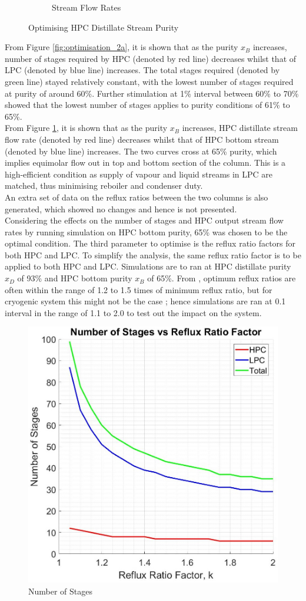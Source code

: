 \begin{figure}[ht]
\begin{subfigure}{0.49\textwidth}
            \caption{Stream Flow Rates} \label{fig:optimisation_2b}
        \end{subfigure}
        \caption{Optimising HPC Distillate Stream Purity} \label{fig:optimsation_2}
    \end{figure}
	From Figure \ref{fig:optimisation_2a}, it is shown that as the purity $x_B$ increases, number of stages required by HPC (denoted by red line) decreases whilst that of LPC (denoted by blue line) increases. The total stages required (denoted by green line) stayed relatively constant, with the lowest number of stages required at purity of around 60\%. Further stimulation at 1\% interval between 60\% to 70\% showed that the lowest number of stages applies to purity conditions of 61\% to 65\%. \\
	From Figure \ref{fig:optimisation_2b}, it is shown that as the purity $x_B$ increases, HPC distillate stream flow rate (denoted by red line) decreases whilst that of HPC bottom stream (denoted by blue line) increases. The two curves cross at 65\% purity, which implies equimolar flow out in top and bottom section of the column. This is a high-efficient condition as supply of vapour and liquid streams in LPC are matched, thus minimising reboiler and condenser duty.\\
	An extra set of data on the reflux ratios between the two columns is also generated, which showed no changes and hence is not presented.\\
	Considering the effects on the number of stages and HPC output stream flow rates by running simulation on HPC bottom purity, 65\% was chosen to be the optimal condition.
    The third parameter to optimise is the reflux ratio factors for both HPC and LPC. To simplify the analysis, the same reflux ratio factor is to be applied to both HPC and LPC. Simulations are to ran at HPC distillate purity $x_D$ of 93\% and HPC bottom purity $x_B$ of 65\%. From \cite{treybal2004}, optimum reflux ratios are often within the range of 1.2 to 1.5 times of minimum reflux ratio, but for cryogenic system this might not be the case \cite{Hankins}; hence simulations are ran at 0.1 interval in the range of 1.1 to 2.0 to test out the impact on the system.
    \begin{figure}[H]
        \centering
        \includegraphics[width=0.45\linewidth]{airseparation/graphics/graph-stages_vs_R.jpg}
        \caption{Number of Stages}
        \label{fig:optimisation_3}
    \end{figure}
